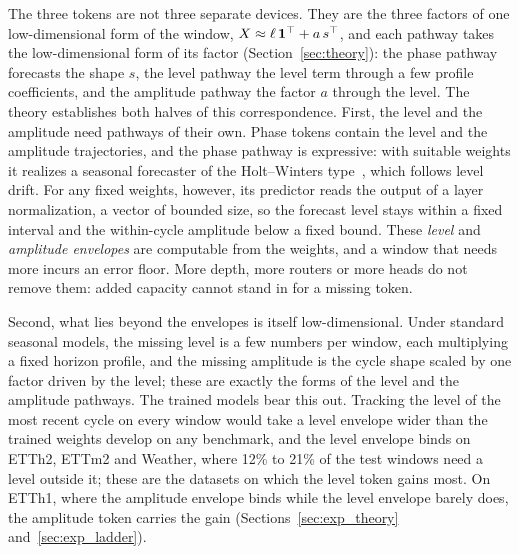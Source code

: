 {
The three tokens are not three separate devices. They are the three factors of one low-dimensional form of the window, $X\approx\ell\,\mathbf 1^\top+a\,s^\top$, and each pathway takes the low-dimensional form of its factor (Section~\ref{sec:theory}): the phase pathway forecasts the shape $s$, the level pathway the level term through a few profile coefficients, and the amplitude pathway the factor $a$ through the level. The theory establishes both halves of this correspondence. First, the level and the amplitude need pathways of their own. Phase tokens contain the level and the amplitude trajectories, and the phase pathway is expressive: with suitable weights it realizes a seasonal forecaster of the Holt--Winters type~\citep{winters1960forecasting}, which follows level drift. For any fixed weights, however, its predictor reads the output of a layer normalization, a vector of bounded size, so the forecast level stays within a fixed interval and the within-cycle amplitude below a fixed bound. These \emph{level} and \emph{amplitude envelopes} are computable from the weights, and a window that needs more incurs an error floor. More depth, more routers or more heads do not remove them: added capacity cannot stand in for a missing token.

Second, what lies beyond the envelopes is itself low-dimensional. Under standard seasonal models, the missing level is a few numbers per window, each multiplying a fixed horizon profile, and the missing amplitude is the cycle shape scaled by one factor driven by the level; these are exactly the forms of the level and the amplitude pathways. The trained models bear this out. Tracking the level of the most recent cycle on every window would take a level envelope wider than the trained weights develop on any benchmark, and the level envelope binds on ETTh2, ETTm2 and Weather, where 12\% to 21\% of the test windows need a level outside it; these are the datasets on which the level token gains most. On ETTh1, where the amplitude envelope binds while the level envelope barely does, the amplitude token carries the gain (Sections~\ref{sec:exp_theory} and~\ref{sec:exp_ladder}).

}
